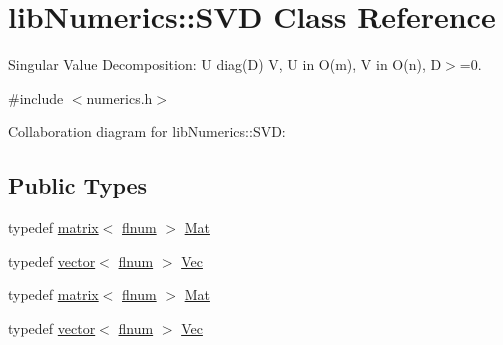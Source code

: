 \hypertarget{classlibNumerics_1_1SVD}{}\section{lib\+Numerics\+:\+:S\+V\+D Class Reference}
\label{classlibNumerics_1_1SVD}


Singular Value Decomposition\+: U diag(\+D) V, U in O(m), V in O(n), D$>$=0.  




{\ttfamily \#include $<$numerics.\+h$>$}



Collaboration diagram for lib\+Numerics\+:\+:S\+V\+D\+:
\subsection*{Public Types}
\begin{DoxyCompactItemize}
\item 
typedef \hyperlink{classlibNumerics_1_1matrix}{matrix}$<$ \hyperlink{namespacelibNumerics_ac94c07350f743d00e3dbcb33b6e974b0}{flnum} $>$ \hyperlink{classlibNumerics_1_1SVD_af7fa146726f27635a88ef053d5dbd4ab}{Mat}
\item 
typedef \hyperlink{classlibNumerics_1_1vector}{vector}$<$ \hyperlink{namespacelibNumerics_ac94c07350f743d00e3dbcb33b6e974b0}{flnum} $>$ \hyperlink{classlibNumerics_1_1SVD_ad713d0bff81dcdd50acc63e285fb6c0d}{Vec}
\item 
typedef \hyperlink{classlibNumerics_1_1matrix}{matrix}$<$ \hyperlink{namespacelibNumerics_ac94c07350f743d00e3dbcb33b6e974b0}{flnum} $>$ \hyperlink{classlibNumerics_1_1SVD_af7fa146726f27635a88ef053d5dbd4ab}{Mat}
\item 
typedef \hyperlink{classlibNumerics_1_1vector}{vector}$<$ \hyperlink{namespacelibNumerics_ac94c07350f743d00e3dbcb33b6e974b0}{flnum} $>$ \hyperlink{classlibNumerics_1_1SVD_ad713d0bff81dcdd50acc63e285fb6c0d}{Vec}
\end{DoxyCompactItemize}
